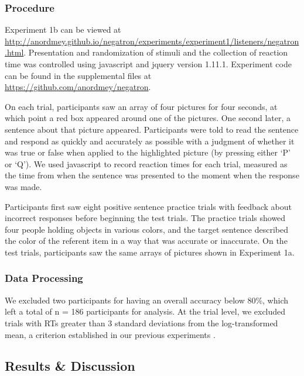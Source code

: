 \documentclass[man, floatsintext, noapacite]{apa6}
\begin{document}
\subsubsection{Procedure}

Experiment 1b can be viewed at \url{http://anordmey.github.io/negatron/experiments/experiment1/listeners/negatron.html}. Presentation and randomization of stimuli and the collection of reaction time was controlled using javascript and jquery version 1.11.1. Experiment code can be found in the supplemental files at  \url{https://github.com/anordmey/negatron}.

On each trial, participants saw an array of four pictures for four seconds, at which point a red box appeared around one of the pictures. One second later, a sentence about that picture appeared. Participants were told to read the sentence and respond as quickly and accurately as possible with a judgment of whether it was true or false when applied to the highlighted picture (by pressing either `P' or `Q').  We used javascript to record reaction times for each trial, measured as the time from when the sentence was presented to the moment when the response was made.

Participants first saw eight positive sentence practice trials with feedback about incorrect responses before beginning the test trials. The practice trials showed four people holding objects in various colors, and the target sentence described the color of the referent item in a way that was accurate or inaccurate. On the test trials, participants saw the same arrays of pictures shown in Experiment 1a. 

\subsubsection{Data Processing} 

We excluded two participants for having an overall accuracy below 80\%, which left a total of n = 186 participants for analysis. At the trial level, we excluded trials with RTs greater than 3 standard deviations from the log-transformed mean, a criterion established in our previous experiments \cite{nordmeyer2014}. 

\subsection{Results \& Discussion}
\end{document}
